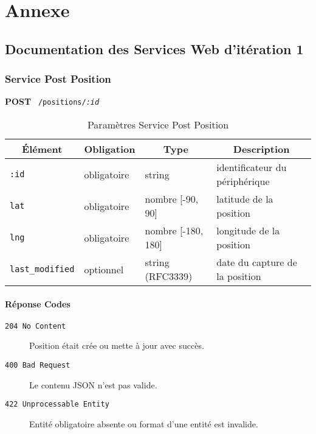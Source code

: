 \chapter{Annexe}
\pagebreak

\section{Documentation des Services Web d'itération 1}

\subsection{Service Post Position}
\label{appendix:sprint1-position-post-doc}

\textbf{POST} \ \texttt{/positions/\textit{:id}}

\begin{table}[htbp]
    \centering
    \caption*{Paramètres Service Post Position}
    \begin{tabular}{llll}
        \toprule
        \multicolumn{1}{c}{\textbf{Élément}} &
        \multicolumn{1}{c}{\textbf{Obligation}} &
        \multicolumn{1}{c}{\textbf{Type}} &
        \multicolumn{1}{c}{\textbf{Description}} \\
        \midrule
        \verb|:id| & obligatoire & string & identificateur du périphérique \\
        \verb|lat| & obligatoire & nombre [-90, 90] & latitude de la position \\
        \verb|lng| & obligatoire & nombre [-180, 180] & longitude de la position \\
        \verb|last_modified| & optionnel & string (RFC3339) & date du capture de la position \\
        \bottomrule
    \end{tabular}
\end{table}

\subsubsection*{Réponse Codes}
\begin{description}
    \item[\texttt{204 No Content}] Position était crée ou mette à jour avec succès.
    \item[\texttt{400 Bad Request}] Le contenu JSON n'est pas valide.
    \item[\texttt{422 Unprocessable Entity}] Entité obligatoire absente ou format d'une entité est invalide.
\end{description}

